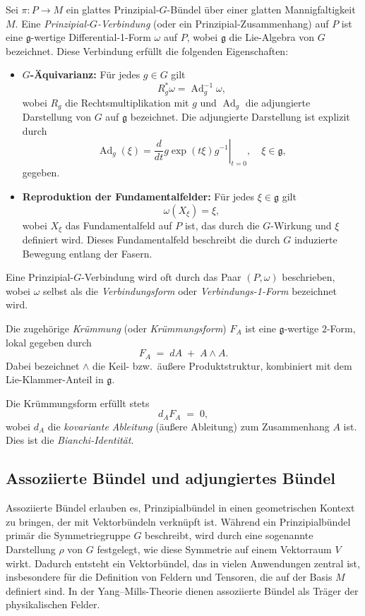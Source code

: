 \documentclass[10pt, letterpaper]{article}
\begin{document}
\begin{definition}
Sei \(\pi: P \to M\) ein glattes Prinzipial-\(G\)-Bündel über einer glatten Mannigfaltigkeit \(M\). Eine \emph{Prinzipial-\(G\)-Verbindung} (oder ein Prinzipial-Zusammenhang) auf \(P\) ist eine \(\mathfrak{g}\)-wertige Differential-1-Form \(\omega\) auf \(P\), wobei \(\mathfrak{g}\) die Lie-Algebra von \(G\) bezeichnet. Diese Verbindung erfüllt die folgenden Eigenschaften:
\begin{itemize}[leftmargin=1.2em]
    \item \textbf{\(G\)-Äquivarianz:} Für jedes \(g \in G\) gilt
    \[
    R_g^* \omega = \operatorname{Ad}_g^{-1} \omega,
    \]
    wobei \(R_g\) die Rechtsmultiplikation mit \(g\) und \(\operatorname{Ad}_g\) die adjungierte Darstellung von \(G\) auf \(\mathfrak{g}\) bezeichnet. Die adjungierte Darstellung ist explizit durch
    \[
    \operatorname{Ad}_g(\xi) = \left.\frac{d}{dt} g \exp(t \xi) g^{-1} \right|_{t=0}, \quad \xi \in \mathfrak{g},
    \]
    gegeben.
    \item \textbf{Reproduktion der Fundamentalfelder:} Für jedes \(\xi \in \mathfrak{g}\) gilt
    \[
    \omega(X_\xi) = \xi,
    \]
    wobei \(X_\xi\) das Fundamentalfeld auf \(P\) ist, das durch die \(G\)-Wirkung und \(\xi\) definiert wird. Dieses Fundamentalfeld beschreibt die durch \(G\) induzierte Bewegung entlang der Fasern.
\end{itemize}
Eine Prinzipial-\(G\)-Verbindung wird oft durch das Paar \((P, \omega)\) beschrieben, wobei \(\omega\) selbst als die \emph{Verbindungsform} oder \emph{Verbindungs-1-Form} bezeichnet wird.
\end{definition}


Die zugehörige \emph{Krümmung} (oder \emph{Krümmungsform}) \(F_A\) ist eine \(\mathfrak{g}\)-wertige \(2\)-Form, lokal gegeben durch
\[
F_A \;=\; dA \;+\; A \wedge A.
\]
Dabei bezeichnet \(\wedge\) die Keil- bzw.\ äußere Produktstruktur, kombiniert mit dem Lie-Klammer-Anteil in \(\mathfrak{g}\).

\begin{remark}
Die Krümmungsform erfüllt stets
\[
d_A F_A \;=\; 0,
\]
wobei \(d_A\) die \emph{kovariante Ableitung} (äußere Ableitung) zum Zusammenhang \(A\) ist. Dies ist die \emph{Bianchi-Identität}.
\end{remark}

\subsection{Assoziierte Bündel und adjungiertes Bündel} Assoziierte Bündel erlauben es, Prinzipialbündel in einen geometrischen Kontext zu bringen, der mit Vektorbündeln verknüpft ist. Während ein Prinzipialbündel primär die Symmetriegruppe \(G\) beschreibt, wird durch eine sogenannte Darstellung \(\rho\) von $G$ festgelegt, wie diese Symmetrie auf einem Vektorraum \(V\) wirkt. Dadurch entsteht ein Vektorbündel, das in vielen Anwendungen zentral ist, insbesondere für die Definition von Feldern und Tensoren, die auf der Basis \(M\) definiert sind. In der Yang--Mills-Theorie dienen assoziierte Bündel als Träger der physikalischen Felder.
\end{document}
